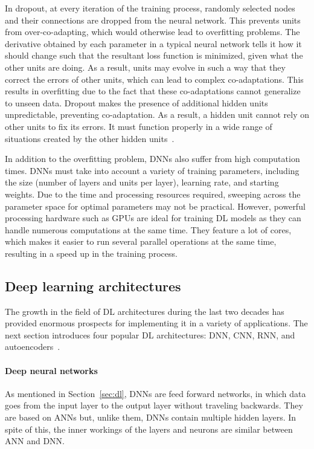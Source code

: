 In dropout, at every iteration of the training process, randomly selected nodes and their connections are dropped from the neural network. This prevents units from over-co-adapting, which would otherwise lead to overfitting problems. The derivative obtained by each parameter in a typical neural network tells it how it should change such that the resultant loss function is minimized, given what the other units are doing. As a result, units may evolve in such a way that they correct the errors of other units, which can lead to complex co-adaptations. This results in overfitting due to the fact that these co-adaptations cannot generalize to unseen data. Dropout makes the presence of additional hidden units unpredictable, preventing co-adaptation. As a result, a hidden unit cannot rely on other units to fix its errors. It must function properly in a wide range of situations created by the other hidden units~\cite{Srivastava2014Dropout:Overfitting}.

In addition to the overfitting problem, \gls{DNN}s also suffer from high computation times. \gls{DNN}s must take into account a variety of training parameters, including the size (number of layers and units per layer), learning rate, and starting weights. Due to the time and processing resources required, sweeping across the parameter space for optimal parameters may not be practical. However, powerful processing hardware such as \gls{GPU}s are ideal for training \gls{DL} models as they can handle numerous computations at the same time. They feature a lot of cores, which makes it easier to run several parallel operations at the same time, resulting in a speed up in the training process.

\subsection{Deep learning architectures}

The growth in the field of \gls{DL} architectures during the last two decades has provided enormous prospects for implementing it in a variety of applications. The next section introduces four popular \gls{DL} architectures: \gls{DNN}, \gls{CNN}, \gls{RNN}, and autoencoders~\cite{Ganatra2018ATools,Madhavan2021DeepDeveloper}.

\paragraph{Deep neural networks} 

As mentioned in Section~\ref{sec:dl}, \gls{DNN}s are feed forward networks, in which data goes from the input layer to the output layer without traveling backwards. They are based on \gls{ANN}s but, unlike them, \gls{DNN}s contain multiple hidden layers. In spite of this, the inner workings of the layers and neurons are similar between \gls{ANN} and \gls{DNN}.

